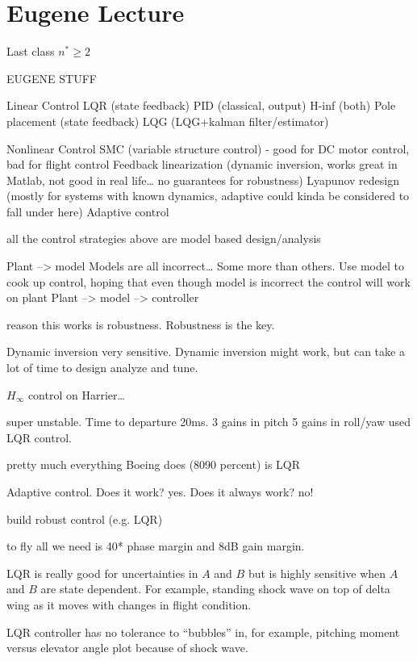 \section{Eugene Lecture}

Last class $n^{*}\geq2$

EUGENE STUFF

Linear Control
LQR (state feedback)
PID (classical, output)
H-inf (both)
Pole placement (state feedback)
LQG (LQG+kalman filter/estimator)

Nonlinear Control
SMC (variable structure control)
- good for DC motor control, bad for flight control
Feedback linearization (dynamic inversion, works great in Matlab, not good in real life\ldots
no guarantees for robustness)
Lyapunov redesign (mostly for systems with known dynamics, adaptive could kinda be considered to fall under here)
Adaptive control

all the control strategies above are model based design/analysis

Plant --> model
Models are all incorrect\ldots
Some more than others.
Use model to cook up control, hoping that even though model is incorrect the control will work on plant
Plant --> model --> controller

reason this works is robustness.
Robustness is the key.

Dynamic inversion very sensitive.
Dynamic inversion might work, but can take a lot of time to design analyze and tune.

$H_{\infty}$ control on Harrier\ldots

\begin{example}[X-45A]
  super unstable.
  Time to departure 20ms.
  3 gains in pitch
  5 gains in roll/yaw
  used LQR control.
\end{example}

pretty much everything Boeing does (80\textemdash{}90 percent) is LQR

Adaptive control.
Does it work? yes.
Does it always work? no!

build robust control (e.g.
LQR)

to fly all we need is 40* phase margin and 8dB gain margin.

LQR is really good for uncertainties in $A$ and $B$ but is highly sensitive when $A$ and $B$ are state dependent.
For example, standing shock wave on top of delta wing as it moves with changes in flight condition.

LQR controller has no tolerance to ``bubbles'' in, for example, pitching moment versus elevator angle plot because of shock wave.

